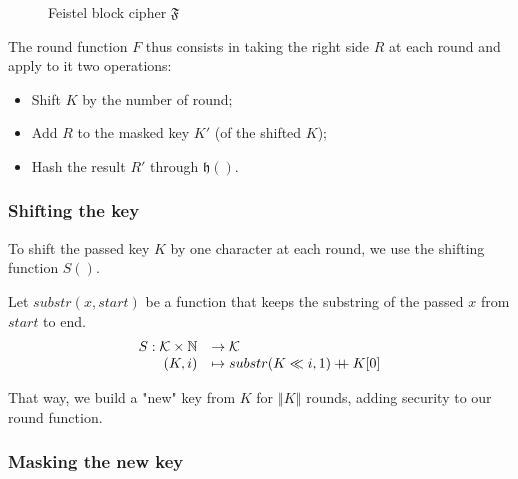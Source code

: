 \documentclass[twoside,twocolumn]{article}
\newcommand{\concat}{\mathbin{{+}\mspace{-8mu}{+}}}
\newcommand{\norm}[1]{\left\Vert#1\right\Vert}
\theoremstyle{definition}
\theoremstyle{remark}
\begin{document}
\begin{figure}
    \caption{Feistel block cipher $\mathfrak{F}$}
    \label{fig:feistel}
\end{figure}

The round function $F$ thus consists in taking the right side $R$ at each round and apply to it two operations:
\begin{itemize}
    \item Shift $K$ by the number of round;
    \item Add $R$ to the masked key $K'$ (of the shifted $K$);
    \item Hash the result $R'$ through $\mathfrak{h}()$.
\end{itemize}

\subsubsection{Shifting the key}

To shift the passed key $K$ by one character at each round, we use the shifting function $S()$.

Let $substr(x, start)$ be a function that keeps the substring of the passed $x$ from $start$ to end.
\begin{equation}
    \label{eq:shifting}
    \begin{array}{rl}
        S: \mathcal{K} \times \mathbb{N} &\to \mathcal{K} \\
            (K, i) &\mapsto substr(K \ll i, 1) \concat K[0] \\
    \end{array}
\end{equation}

That way, we build a "new" key from $K$ for $\norm{K}$ rounds, adding security to our round function.

\subsubsection{Masking the new key}
\end{document}
